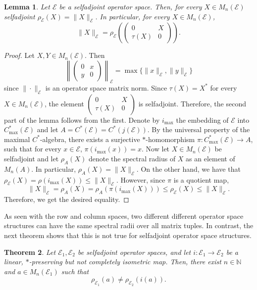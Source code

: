 \documentclass[12pt]{amsart}
\numberwithin{equation}{section}
\newtheorem{theorem}{Theorem}[section]
\newtheorem{lemma}[theorem]{Lemma}
\theoremstyle{definition}
\newcommand{\be}{\begin{equation}}
\newcommand{\ee}{\end{equation}}
\newcommand{\cE}{\mathcal{E}}
\begin{document}
\begin{lemma}\label{lem: radius=norm}
    Let $\mathcal{E}$ be a selfadjoint operator space. Then, for every $X \in M_n(\cE)$ selfadjoint $\rho_{\cE}(X) = \|X\|_{\cE}$. In particular, for every $X \in M_n(\cE)$,
      \[
      \|X\|_{\mathcal{E}}=\rho_\mathcal{E}\left(\begin{pmatrix} 0 & X\\ \tau(X) & 0\end{pmatrix}\right).
      \]
\end{lemma}

\begin{proof}
    Let $X, Y\in M_n(\mathcal{E})$. Then
      \be \label{eq:mat_norm}
        \left\|
        \begin{pmatrix}
        0 & x\\
        y & 0
        \end{pmatrix}
        \right\|_{\mathcal{E}}
        =
        \max\{\|x\|_\mathcal{E},\|y\|_\mathcal{E}\}
      \ee
    since $\|\cdot\|_\mathcal{E}$ is an operator space matrix norm. Since $\tau(X)=X^*$ for every $X \in M_n(\cE)$, the element $\begin{pmatrix} 0 & X\\ \tau(X) & 0\end{pmatrix}$ is selfadjoint. Therefore, the second part of the lemma follows from the first. Denote by $i_{\max}$ the embedding of $\cE$ into $C^*_{\max}(\cE)$ and let $A = C^*(\cE) = C^*(j(\cE))$. By the universal property of the maximal $C^*$-algebra, there exists a surjective $*$-homomorphism $\pi \colon C^*_{\max}(\cE) \to A$, such that for every $x \in \cE$,  $\pi(i_{\max}(x)) = x$. Now let $X \in M_n(\cE)$ be selfadjoint and let $\rho_A(X)$ denote the spectral radius of $X$ as an element of $M_n(A)$. In particular, $\rho_A(X) = \|X\|_{\cE}$. On the other hand, we have that $\rho_{\cE}(X) = \rho(i_{\max}(X)) \leq \|X\|_{\cE}$. However, since $\pi$ is a quotient map,
    \[
    \|X\|_{\cE} = \rho_A(X) = \rho_A(\pi(i_{\max}(X))) \leq \rho_{\cE}(X) \leq \|X\|_{\cE}.
    \]
    Therefore, we get the desired equality.
    

\end{proof}

As seen with the row and column spaces, two different different operator space structures can have the same spectral radii over all matrix tuples. In contrast, the next theorem shows that this is not true for selfadjoint operator space structures.

\begin{theorem} \label{thm:selfadj_ineq}
    Let $\mathcal{E}_1, \mathcal{E}_2$ be selfadjoint operator spaces, and let $i:\mathcal{E}_1\to \mathcal{E}_2$ be a linear, $*$-preserving but not completely isometric map. Then, there exist $n\in\mathbb{N}$ and $a\in M_n(\mathcal{E}_1)$ such that 
      \[
        \rho_{\mathcal{E}_1}(a)\neq\rho_{\mathcal{E}_2}(i(a)).
      \]
\end{theorem}
\end{document}
